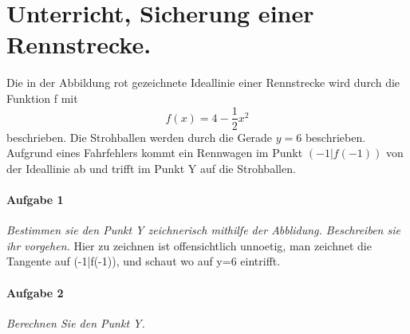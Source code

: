 \documentclass{book}
\begin{document}
\section{Unterricht, Sicherung einer Rennstrecke.}


Die in der Abbildung rot gezeichnete Ideallinie einer Rennstrecke wird durch
die Funktion f mit 
\[ f(x)=4-\frac{1}{2}x^2\]
beschrieben. Die Strohballen werden durch die Gerade $y=6$ beschrieben.
Aufgrund eines Fahrfehlers kommt ein Rennwagen im Punkt $(-1|f(-1))$ von der
Ideallinie ab und trifft im Punkt Y auf die Strohballen.

\paragraph{Aufgabe 1} \textit{Bestimmen sie den Punkt Y zeichnerisch mithilfe der Abblidung. Beschreiben sie ihr vorgehen.}
Hier zu zeichnen ist offensichtlich unnoetig, man zeichnet die Tangente auf (-1|f(-1)), und schaut wo auf y=6 eintrifft.


\paragraph{Aufgabe 2} \textit{Berechnen Sie den Punkt Y.}
\end{document}

